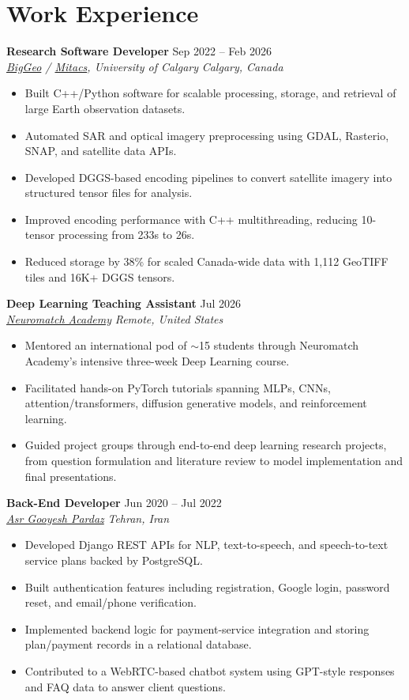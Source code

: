 \documentclass[a4paper,10pt]{article}
\newcommand{\resumeSubheading}[4]{
    \textbf{#1} \hfill #2 \\
    \textit{#3} \hfill \textit{#4}
}
\begin{document}
\section*{Work Experience}

\resumeSubheading
{Research Software Developer}
{Sep 2022 -- Feb 2026}
{\href{https://biggeo.com}{BigGeo} / \href{https://www.mitacs.ca/}{Mitacs}, University of Calgary}
{Calgary, Canada}
\begin{itemize}[leftmargin=0.25in]
    \item Built C++/Python software for scalable processing, storage, and retrieval of large Earth observation datasets.
    \item Automated SAR and optical imagery preprocessing using GDAL, Rasterio, SNAP, and satellite data APIs.
    \item Developed DGGS-based encoding pipelines to convert satellite imagery into structured tensor files for analysis.
    \item Improved encoding performance with C++ multithreading, reducing 10-tensor processing from 233s to 26s.
    \item Reduced storage by 38\% for scaled Canada-wide data with 1,112 GeoTIFF tiles and 16K+ DGGS tensors.
\end{itemize}

\resumeSubheading
{Deep Learning Teaching Assistant}
{Jul 2026}
{\href{https://neuromatch.io/}{Neuromatch Academy}}
{Remote, United States}
\begin{itemize}[leftmargin=0.25in]
    \item Mentored an international pod of $\sim$15 students through Neuromatch Academy's intensive three-week Deep Learning course.
    \item Facilitated hands-on PyTorch tutorials spanning MLPs, CNNs, attention/transformers, diffusion generative models, and reinforcement learning.
    \item Guided project groups through end-to-end deep learning research projects, from question formulation and literature review to model implementation and final presentations.
\end{itemize}

\resumeSubheading
{Back-End Developer}
{Jun 2020 -- Jul 2022}
{\href{https://asr-gooyesh.com/en/}{Asr Gooyesh Pardaz}}
{Tehran, Iran}
\begin{itemize}[leftmargin=0.25in]
    \item Developed Django REST APIs for NLP, text-to-speech, and speech-to-text service plans backed by PostgreSQL.
    \item Built authentication features including registration, Google login, password reset, and email/phone verification.
    \item Implemented backend logic for payment-service integration and storing plan/payment records in a relational database.
    \item Contributed to a WebRTC-based chatbot system using GPT-style responses and FAQ data to answer client questions.
\end{itemize}
\end{document}
